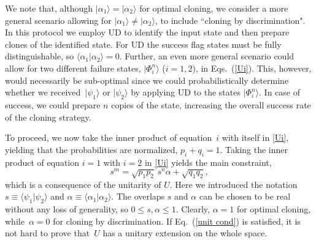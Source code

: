 \documentclass[aps,prl,twocolumn,showpacs]{revtex4}
\newcommand{\ke}[1]{|#1\rangle}
\newcommand{\bk}[2]{\langle #1|#2\rangle}
\begin{document}
We note that, although $|\alpha_1\rangle=|\alpha_2\rangle$ for optimal cloning, we consider a more general scenario allowing for $|\alpha_1\rangle \neq |\alpha_2\rangle$, to include ``cloning by discrimination". In this protocol we employ UD to identify the input state and then prepare clones of the identified state. For UD the success flag states must be fully distinguishable, so $\langle\alpha_1|\alpha_2\rangle=0$. Further, an even more general scenario could allow for two different failure states, $|\Phi_i^{n}\rangle$ ($i=1,2$), in Eqs.~(\ref{Ui}). This, however, would necessarily be sub-optimal since we could probabilistically determine whether we received~$\ke{\psi_1}$ or $\ke{\psi_2}$ by applying UD to the states $\ke {\Phi_i^{n}}$.  In case of success, we could prepare $n$ copies of the state, increasing the overall success rate of the cloning strategy.

To proceed, we now take the inner product of equation~$i$ with itself in \eqref{Ui}, yielding that the probabilities are normalized, $p_i+q_i=1$. Taking the inner product of equation $i=1$ with $i=2$ in \eqref{Ui} yields the main constraint, 
%
\begin{equation}
s^m=\sqrt{p_1 p_2}\, s^n \alpha+\sqrt{q_1 q_2},
\label{unit cond}
\end{equation}
%
which is a consequence of the unitarity of $U$. Here we introduced the notation $s \equiv \bk {\psi_1}{\psi_2}$ and  $\alpha \equiv \langle\alpha_1|\alpha_2\rangle$. The overlaps $s$ and $\alpha$ can be chosen to be real without any loss of generality, so $0 \le s, \alpha \le 1$.  Clearly, $\alpha=1$ for optimal cloning, while~$\alpha=0$ for cloning by discrimination. If Eq.~(\ref{unit cond}) is satisfied, it is not hard to prove that~$U$ has a unitary extension on the whole space. %
\end{document}

